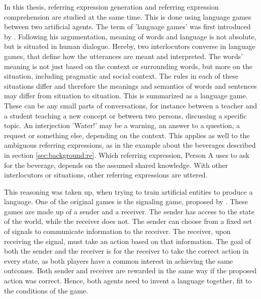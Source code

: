 In this thesis, referring expression generation and referring expression comprehension are studied at the same time.
This is done using language games between two artificial agents.
The term of 'language games' was first introduced by \citet{Wittgenstein1953}.
Following his argumentation, meaning of words and language is not absolute, but is situated in human dialogue.
Hereby, two interlocutors converse in language games, that define how the utterances are meant and interpreted.
The words' meaning is not just based on the context or surrounding words, but more on the situation, including pragmatic and social context.
The rules in each of these situations differ and therefore the meanings and semantics of words and sentences may differ from situation to situation.
This is summarized as a language game.
These can be any small parts of conversations, for instance between a teacher and a student teaching a new concept or between two persons, discussing a specific topic.
An interjection 'Water!' may be a warning, an answer to a question, a request or something else, depending on the context.
This applies as well to the ambiguous referring expressions, as in the example about the beverages described in section \ref{sec:background:re}.
Which referring expression, Person A uses to ask for the beverage, depends on the assumed shared knowledge.
With other interlocutors or situations, other referring expressions are uttered.

This reasoning was taken up, when trying to train artificial entities to produce a language.
One of the original games is the signaling game, proposed by \citet{Lewis1969}.
These games are made up of a sender and a receiver.
The sender has access to the state of the world, while the receiver does not.
The sender can choose from a fixed set of signals to communicate information to the receiver.
The receiver, upon receiving the signal, must take an action based on that information.
The goal of both the sender and the receiver is for the receiver to take the correct action in every state, as both players have a common interest in achieving the same outcomes.
Both sender and receiver are rewarded in the same way if the proposed action was correct.
Hence, both agents need to invent a language together, fit to the conditions of the game.

